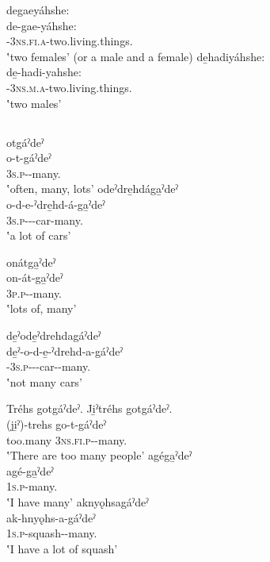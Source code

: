 \newpage
\ex degaeyáhshe: \\
\gll de-gae-yáhshe:\\
\textsc{{\dualic}-3ns.fi.a}-two.living.things.{\stative}\\
\glt ‛two females' (or a male and a female) 
\ex de̱hadiyáhshe:\\
\gll de̱-hadi-yahshe:\\
\textsc{{\dualic}-3ns.m.a}-two.living.things.{\stative}\\
\glt ‛two males'
\z
\z

\subsection{  } \label{[O…-gaˀdeˀ] many}

\ea\label{ex:countingdict16}
\ea otgáˀdeˀ\\
\gll o-t-gáˀdeˀ \\
\textsc{3s.p}-{\semireflexive}-many.{\stative}\\
\glt ‛often, many, lots'
\ex odeˀdre̱hdága̱ˀdeˀ\\
\gll o-d-e-ˀdre̱hd-á-ga̱ˀdeˀ\\
\textsc{3s.p-{\semireflexive}}-{\joinerE}-car-many.{\stative}\\
\glt ‛a lot of cars'

\ex onátga̱ˀdeˀ \\
\gll on-át-ga̱ˀdeˀ \\
\textsc{3p.p}-{\semireflexive}-many.{\stative}\\
\glt ‛lots of, many'

\ex de̱ˀode̱ˀdrehdagáˀdeˀ\\
\gll de̱ˀ-o-d-e̱-ˀdrehd-a-gáˀdeˀ \\
\textsc{{\negative}-3s.p-{\semireflexive}}-{\joinerE}-car-{\joinerA}-many.{\stative}\\
\glt ‛not many cars'

\newpage
\ex Tréhs gotgáˀdeˀ. Ji̱ˀtréhs gotgáˀdeˀ.\\
\gll (ji̱ˀ)-trehs go-t-gáˀdeˀ \\
too.many \textsc{3ns.fi.p}-{\semireflexive}-many.{\stative}\\
\glt ‛There are too many people'
\ex agéga̱ˀdeˀ \\
\gll agé-ga̱ˀdeˀ \\
\textsc{1s.p}-many.{\stative}\\
\glt ‛I have many' 
\ex aknyǫhsagáˀdeˀ \\
\gll ak-hnyǫhs-a-gáˀdeˀ\\
\textsc{1s.p}-squash-{\joinerA}-many.{\stative}\\
\glt ‛I have a lot of squash'
\z
\z

